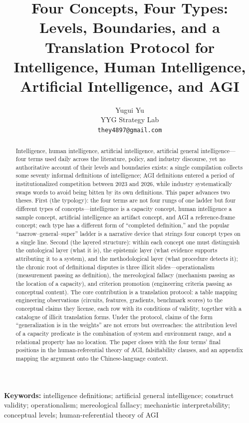 \documentclass[10pt]{article}
\title{\textbf{Four Concepts, Four Types:\\Levels, Boundaries, and a Translation Protocol for\\Intelligence, Human Intelligence, Artificial Intelligence, and AGI}}
\author{Yugui Yu\\ YYG Strategy Lab\\ \texttt{they4897@gmail.com}}
\date{}
\begin{document}
\maketitle

\begin{abstract}
\noindent Intelligence, human intelligence, artificial intelligence, artificial general intelligence---four terms used daily across the literature, policy, and industry discourse, yet no authoritative account of their levels and boundaries exists: a single compilation collects some seventy informal definitions of intelligence; AGI definitions entered a period of institutionalized competition between 2023 and 2026, while industry systematically swaps words to avoid being bitten by its own definitions. This paper advances two theses. First (the typology): the four terms are not four rungs of one ladder but four different types of concepts---intelligence is a capacity concept, human intelligence a sample concept, artificial intelligence an artifact concept, and AGI a reference-frame concept; each type has a different form of ``completed definition,'' and the popular ``narrow--general--super'' ladder is a narrative device that strings four concept types on a single line. Second (the layered structure): within each concept one must distinguish the ontological layer (what it is), the epistemic layer (what evidence supports attributing it to a system), and the methodological layer (what procedure detects it); the chronic root of definitional disputes is three illicit slides---operationalism (measurement passing as definition), the mereological fallacy (mechanism passing as the location of a capacity), and criterion promotion (engineering criteria passing as conceptual content). The core contribution is a translation protocol: a table mapping engineering observations (circuits, features, gradients, benchmark scores) to the conceptual claims they license, each row with its conditions of validity, together with a catalogue of illicit translation forms. Under the protocol, claims of the form ``generalization is in the weights'' are not errors but overreaches: the attribution level of a capacity predicate is the combination of system and environment range, and a relational property has no location. The paper closes with the four terms' final positions in the human-referential theory of AGI, falsifiability clauses, and an appendix mapping the argument onto the Chinese-language context.
\end{abstract}

\medskip
\noindent\textbf{Keywords:} intelligence definitions; artificial general intelligence; construct validity; operationalism; mereological fallacy; mechanistic interpretability; conceptual levels; human-referential theory of AGI
\end{document}
